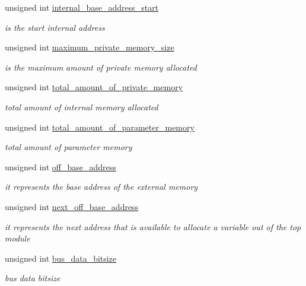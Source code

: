 \begin{DoxyCompactItemize}
unsigned int \hyperlink{classmemory_ac55060cc8c48960f050d7c1a08b31d52}{internal\+\_\+base\+\_\+address\+\_\+start}
\begin{DoxyCompactList}\small\item\em is the start internal address \end{DoxyCompactList}\item 
unsigned int \hyperlink{classmemory_a15e811711b1637eee51ca9f590adaec8}{maximum\+\_\+private\+\_\+memory\+\_\+size}
\begin{DoxyCompactList}\small\item\em is the maximum amount of private memory allocated \end{DoxyCompactList}\item 
unsigned int \hyperlink{classmemory_a3103b469a197d1ec13ece20de36c994d}{total\+\_\+amount\+\_\+of\+\_\+private\+\_\+memory}
\begin{DoxyCompactList}\small\item\em total amount of internal memory allocated \end{DoxyCompactList}\item 
unsigned int \hyperlink{classmemory_a7622b3919a88ad790782facf9d490f95}{total\+\_\+amount\+\_\+of\+\_\+parameter\+\_\+memory}
\begin{DoxyCompactList}\small\item\em total amount of parameter memory \end{DoxyCompactList}\item 
unsigned int \hyperlink{classmemory_ac97a5cf7a49915e6ca63883c30c0e599}{off\+\_\+base\+\_\+address}
\begin{DoxyCompactList}\small\item\em it represents the base address of the external memory \end{DoxyCompactList}\item 
unsigned int \hyperlink{classmemory_a276dd744b44a4862ff5d6c294d638965}{next\+\_\+off\+\_\+base\+\_\+address}
\begin{DoxyCompactList}\small\item\em it represents the next address that is available to allocate a variable out of the top module \end{DoxyCompactList}\item 
unsigned int \hyperlink{classmemory_a0bbe4c23f492172e842d5de6334f48b7}{bus\+\_\+data\+\_\+bitsize}
\begin{DoxyCompactList}\small\item\em bus data bitsize \end{DoxyCompactList}\item 

\end{DoxyCompactItemize}
